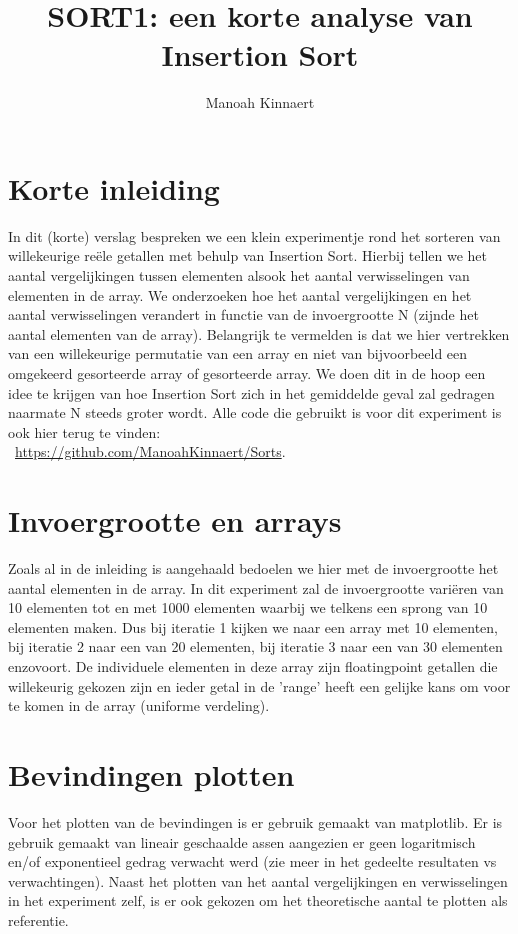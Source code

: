 \documentclass[12pt, dutch]{article}
\title{SORT1: een korte analyse van Insertion Sort}
\author{Manoah Kinnaert}
\begin{document}
\begin{titlepage}
    \maketitle
\end{titlepage}
\pagebreak
\section{Korte inleiding}
In dit (korte) verslag bespreken we een klein experimentje rond het sorteren van willekeurige reële getallen met behulp van Insertion Sort. Hierbij tellen we het aantal vergelijkingen tussen elementen alsook het aantal verwisselingen
van elementen in de array. We onderzoeken hoe het aantal vergelijkingen en het aantal verwisselingen verandert in functie van de invoergrootte N (zijnde het aantal elementen van de array).
Belangrijk te vermelden is dat we hier vertrekken van een willekeurige permutatie van een array en niet van bijvoorbeeld een omgekeerd gesorteerde array of gesorteerde array.
We doen dit in de hoop een idee te krijgen van hoe Insertion Sort zich in het gemiddelde geval zal gedragen naarmate N steeds groter wordt.
Alle code die gebruikt is voor dit experiment is ook hier terug te vinden: \\\ 
\url{https://github.com/ManoahKinnaert/Sorts}.

\section{Invoergrootte en arrays}
Zoals al in de inleiding is aangehaald bedoelen we hier met de invoergrootte het aantal elementen in de array. 
In dit experiment zal de invoergrootte variëren van 10 elementen tot en met 1000 elementen waarbij we telkens een sprong van 10 elementen maken.
Dus bij iteratie 1 kijken we naar een array met 10 elementen, bij iteratie 2 naar een van 20 elementen, bij iteratie 3 naar een van 30 elementen enzovoort.
De individuele elementen in deze array zijn floatingpoint getallen die willekeurig gekozen zijn en ieder getal in de 'range' heeft een gelijke kans om voor te komen in de array (uniforme verdeling).

\section{Bevindingen plotten}
Voor het plotten van de bevindingen is er gebruik gemaakt van matplotlib. Er is gebruik gemaakt van lineair geschaalde assen aangezien
er geen logaritmisch en/of exponentieel gedrag verwacht werd (zie meer in het gedeelte resultaten vs verwachtingen). 
Naast het plotten van het aantal vergelijkingen en verwisselingen in het experiment zelf, 
is er ook gekozen om het theoretische aantal te plotten als referentie.
\end{document}
